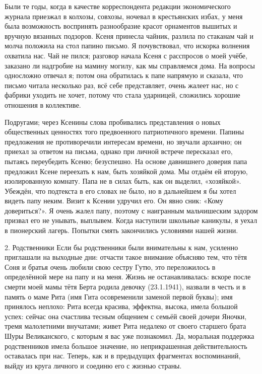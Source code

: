 \label{195-1}
Были те годы, когда в качестве корреспондента редакции экономического журнала приезжал в колхозы, совхозы, ночевал в крестьянских избах, у меня была возможность воспринять разнообразие красот орнаментов вышитых и вручную вязанных подзоров. Ксеня принесла чайник, разлила по стаканам чай и молча положила на стол папино письмо. Я почувствовал, что искорка волнения охватила нас. Чай не пился; разговор начала Ксеня с расспросов о моей учёбе, заказано ли надгробие на мамину могилу, как мы справляемся дома. На вопросы односложно отвечал я; потом она обратилась к папе напрямую и сказала, что письмо читала несколько раз, всё себе представляет, очень жалеет нас, но с фабрики уходить не хочет, потому что стала ударницей, сложились хорошие отношения в коллективе.

\label{196-1}
Подругами; через Ксенины слова пробивались представления о новых общественных ценностях того предвоенного патриотичного времени. Папины предложения не противоречили интересам времени, но звучали архаично; он приехал за ответом на письма, однако при личной встрече пересказал его, пытаясь переубедить Ксеню; безуспешно. На основе давнишнего доверия папа предложил Ксене переехать к нам, быть хозяйкой дома. Мы отдаём ей вторую, изолированную комнату. Папа не в силах быть, как он выделил, «хозяйкой». Убеждён, что подтекста в его словах не было, но в дальнейшем я бы хотел видеть папу неким. Визит к Ксении удручил его. Он явно сник: «Кому довериться?». Я очень жалел папу, поэтому с наигранным мальчишеским задором призвал его не унывать, выплывем. Когда наступили школьные каникулы, я уехал в пионерский лагерь. Попытки смять закончились условиями нашей жизни.

\label{197-1}
2. Родственники
Если бы родственники были внимательны к нам, усиленно приглашали на выходные дни: отчасти такое внимание объясняю тем, что тётя Соня и братья очень любили свою сестру Гутю, это переложилось в определённой мере на папу и на меня. Жизнь не останавливалась: вскоре после смерти моей мамы тётя Берта родила девочку (23.1.1941), назвали в честь и в память о маме Рита (имя Гита осовременили заменой первой буквы); имя принялось неплохо: Рита всегда красива, эффектна, высока, имела большой успех: сейчас она счастлива тесным общением с семьёй своей дочери Яночки, тремя малолетними внучатами; живет Рита недалеко от своего старшего брата Шуры Великанского, с которым я вас уже познакомил. Да, моральная поддержка родственников имела большое значение, но неприкрашенная действительность оставалась при нас.
Теперь, как и в предыдущих фрагментах воспоминаний, выйду из круга личного и соединю его с жизнью страны.